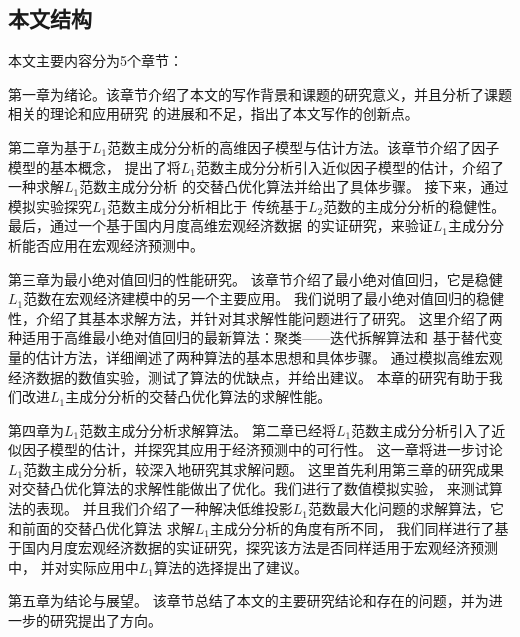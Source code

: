 \subsection{本文结构}

本文主要内容分为5个章节：

第一章为绪论。该章节介绍了本文的写作背景和课题的研究意义，并且分析了课题相关的理论和应用研究
的进展和不足，指出了本文写作的创新点。

第二章为基于$L_1$范数主成分分析的高维因子模型与估计方法。该章节介绍了因子模型的基本概念，
提出了将$L_1$范数主成分分析引入近似因子模型的估计，介绍了一种求解$L_1$范数主成分分析
的交替凸优化算法并给出了具体步骤。
接下来，通过模拟实验探究$L_1$范数主成分分析相比于
传统基于$L_2$范数的主成分分析的稳健性。
最后，通过一个基于国内月度高维宏观经济数据
的实证研究，来验证$L_1$主成分分析能否应用在宏观经济预测中。

第三章为最小绝对值回归的性能研究。
该章节介绍了最小绝对值回归，它是稳健$L_1$范数在宏观经济建模中的另一个主要应用。
我们说明了最小绝对值回归的稳健性，介绍了其基本求解方法，并针对其求解性能问题进行了研究。
这里介绍了两种适用于高维最小绝对值回归的最新算法：聚类——迭代拆解算法和
基于替代变量的估计方法，详细阐述了两种算法的基本思想和具体步骤。
通过模拟高维宏观经济数据的数值实验，测试了算法的优缺点，并给出建议。
本章的研究有助于我们改进$L_1$主成分分析的交替凸优化算法的求解性能。

第四章为$L_1$范数主成分分析求解算法。
第二章已经将$L_1$范数主成分分析引入了近似因子模型的估计，并探究其应用于经济预测中的可行性。
这一章将进一步讨论$L_1$范数主成分分析，较深入地研究其求解问题。
这里首先利用第三章的研究成果
对交替凸优化算法的求解性能做出了优化。我们进行了数值模拟实验，
来测试算法的表现。
并且我们介绍了一种解决低维投影$L_1$范数最大化问题的求解算法，它和前面的交替凸优化算法
求解$L_1$主成分分析的角度有所不同，
我们同样进行了基于国内月度宏观经济数据的实证研究，探究该方法是否同样适用于宏观经济预测中，
并对实际应用中$L_1$算法的选择提出了建议。

第五章为结论与展望。
该章节总结了本文的主要研究结论和存在的问题，并为进一步的研究提出了方向。
